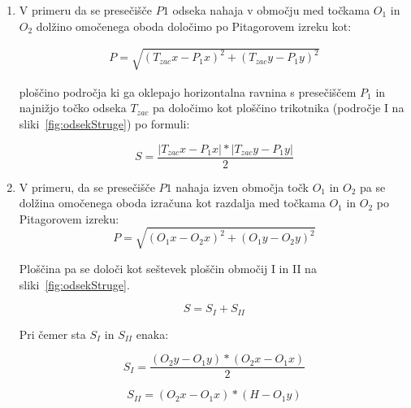 \begin{enumerate}
	\item V primeru da se presečišče $P1$ odseka nahaja v območju med točkama $O_1$ in $O_2$ dolžino omočenega oboda določimo po Pitagorovem izreku kot:
	
	
	\begin{ceqn}
		\begin{align}
		P = \sqrt{(T_{zac}x - P_1x)^{2} + (T_{zac}y - P_1y)^{2}}
		\end{align}
	\end{ceqn}
	
	
	ploščino področja ki ga oklepajo horizontalna ravnina s presečiščem $P_1$ in najnižjo točko odseka $T_{zac}$ pa določimo kot ploščino trikotnika (področje I na sliki~\ref{fig:odsekStruge}) po formuli:
	
	\begin{equation}
	S = \dfrac{|T_{zac}x - P_1x| * |T_{zac}y - P_1y|}{2}
	\end{equation}
	
	
	\item V primeru, da se presečišče $P1$ nahaja izven območja točk $O_1$ in $O_2$ pa se dolžina omočenega oboda izračuna kot razdalja med točkama $O_1$ in $O_2$ po Pitagorovem izreku:
	\begin{equation}
	P = \sqrt{ (O_1x - O_2x)^{2} + (O_1y - O_2y)^{2}}
	\end{equation}
	
	Ploščina pa se določi kot seštevek ploščin območij I in II na sliki~\ref{fig:odsekStruge}.
	
	\begin{equation}
	S = S_I + S_{II}
	\end{equation}
	
	Pri čemer sta $S_I$ in $S_{II}$ enaka:
	
	\begin{equation}
	S_I =\dfrac{ (O_2y - O_1y) *  (O_2x - O_1x)}{2}
	\end{equation}
	
	\begin{equation}
	S_{II} = (O_2x - O_1x) * (H - O_1y)
	\end{equation}
	
	
	
	
	
\end{enumerate}


